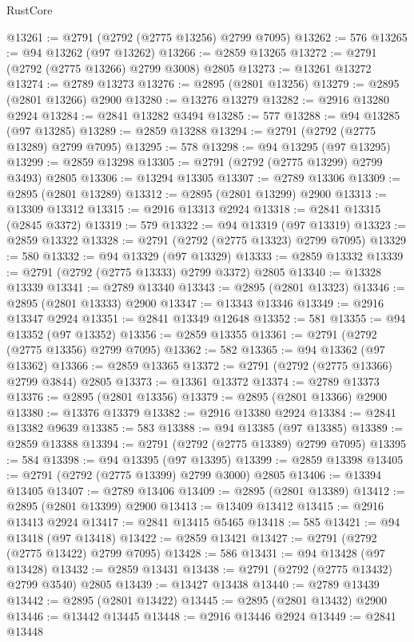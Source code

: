 \begin{lexlean}{RustCore}
\begin{coremodule}
@13261 := @2791 (@2792 (@2775 @13256) @2799 @7095)
@13262 := 576
@13265 := @94 @13262 (@97 @13262)
@13266 := @2859 @13265
@13272 := @2791 (@2792 (@2775 @13266) @2799 @3008) @2805
@13273 := @13261 @13272
@13274 := @2789 @13273
@13276 := @2895 (@2801 @13256)
@13279 := @2895 (@2801 @13266) @2900
@13280 := @13276 @13279
@13282 := @2916 @13280 @2924
@13284 := @2841 @13282 @3494
@13285 := 577
@13288 := @94 @13285 (@97 @13285)
@13289 := @2859 @13288
@13294 := @2791 (@2792 (@2775 @13289) @2799 @7095)
@13295 := 578
@13298 := @94 @13295 (@97 @13295)
@13299 := @2859 @13298
@13305 := @2791 (@2792 (@2775 @13299) @2799 @3493) @2805
@13306 := @13294 @13305
@13307 := @2789 @13306
@13309 := @2895 (@2801 @13289)
@13312 := @2895 (@2801 @13299) @2900
@13313 := @13309 @13312
@13315 := @2916 @13313 @2924
@13318 := @2841 @13315 (@2845 @3372)
@13319 := 579
@13322 := @94 @13319 (@97 @13319)
@13323 := @2859 @13322
@13328 := @2791 (@2792 (@2775 @13323) @2799 @7095)
@13329 := 580
@13332 := @94 @13329 (@97 @13329)
@13333 := @2859 @13332
@13339 := @2791 (@2792 (@2775 @13333) @2799 @3372) @2805
@13340 := @13328 @13339
@13341 := @2789 @13340
@13343 := @2895 (@2801 @13323)
@13346 := @2895 (@2801 @13333) @2900
@13347 := @13343 @13346
@13349 := @2916 @13347 @2924
@13351 := @2841 @13349 @12648
@13352 := 581
@13355 := @94 @13352 (@97 @13352)
@13356 := @2859 @13355
@13361 := @2791 (@2792 (@2775 @13356) @2799 @7095)
@13362 := 582
@13365 := @94 @13362 (@97 @13362)
@13366 := @2859 @13365
@13372 := @2791 (@2792 (@2775 @13366) @2799 @3844) @2805
@13373 := @13361 @13372
@13374 := @2789 @13373
@13376 := @2895 (@2801 @13356)
@13379 := @2895 (@2801 @13366) @2900
@13380 := @13376 @13379
@13382 := @2916 @13380 @2924
@13384 := @2841 @13382 @9639
@13385 := 583
@13388 := @94 @13385 (@97 @13385)
@13389 := @2859 @13388
@13394 := @2791 (@2792 (@2775 @13389) @2799 @7095)
@13395 := 584
@13398 := @94 @13395 (@97 @13395)
@13399 := @2859 @13398
@13405 := @2791 (@2792 (@2775 @13399) @2799 @3000) @2805
@13406 := @13394 @13405
@13407 := @2789 @13406
@13409 := @2895 (@2801 @13389)
@13412 := @2895 (@2801 @13399) @2900
@13413 := @13409 @13412
@13415 := @2916 @13413 @2924
@13417 := @2841 @13415 @5465
@13418 := 585
@13421 := @94 @13418 (@97 @13418)
@13422 := @2859 @13421
@13427 := @2791 (@2792 (@2775 @13422) @2799 @7095)
@13428 := 586
@13431 := @94 @13428 (@97 @13428)
@13432 := @2859 @13431
@13438 := @2791 (@2792 (@2775 @13432) @2799 @3540) @2805
@13439 := @13427 @13438
@13440 := @2789 @13439
@13442 := @2895 (@2801 @13422)
@13445 := @2895 (@2801 @13432) @2900
@13446 := @13442 @13445
@13448 := @2916 @13446 @2924
@13449 := @2841 @13448

\end{coremodule}
\end{lexlean}
